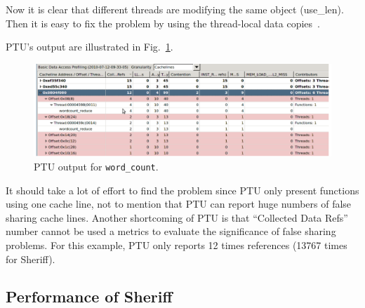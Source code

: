 Now it is clear that different threads are modifying the same object (use\_len). 
Then it is easy to fix the problem by using the thread-local data copies~\cite{detect:intel}. 

PTU's output are illustrated in Fig.~\ref{fig:wordcount}. 
\begin{figure}[!t]
\centering
\includegraphics[width=6in]{figure/wordcount}
\caption{PTU output for \texttt{word\_count}.
\label{fig:wordcount}}
\end{figure}

It should take a lot of effort to find the problem since PTU only present functions using 
one cache line, not to mention that PTU can report huge numbers of false sharing cache lines.
Another shortcoming of PTU is that ``Collected Data Refs'' number cannot be used a metrics 
to evaluate the significance of false sharing problems. For this example, PTU only reports 
12 times references (13767 times for Sheriff). 

\subsection{Performance of Sheriff}
\label{sec:results-runtime-overhead}

